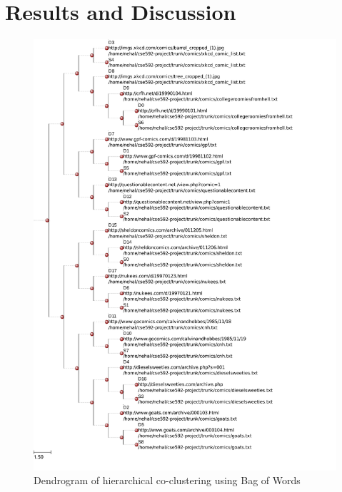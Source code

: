 \documentclass[11pt]{article}
\begin{document}
\section{Results and Discussion}
\begin{figure}[H]
  \includegraphics[scale=0.4]{demo1.pdf}
  \caption{Dendrogram of hierarchical co-clustering using Bag of Words}
\end{figure}
\end{document}
